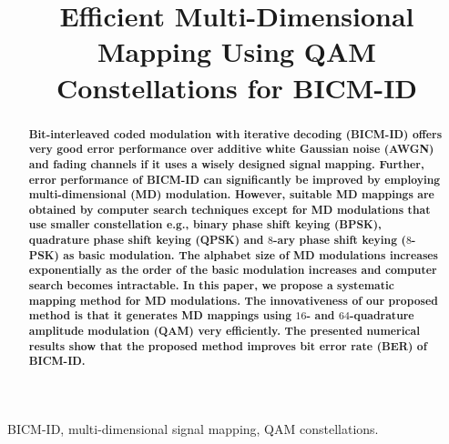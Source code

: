 \documentclass[12pt, draftclsnofoot, onecolumn]{IEEEtran}
\begin{document}
\sloppy
\title{Efficient Multi-Dimensional Mapping Using QAM Constellations for BICM-ID}

\author{
}
\maketitle
\begin{abstract}
\textbf{Bit-interleaved coded modulation with iterative decoding (BICM-ID)  offers  very good error performance over   additive white Gaussian noise (AWGN) and fading channels if it uses a wisely designed signal mapping. Further,  error performance of BICM-ID can  significantly be improved by employing multi-dimensional (MD) modulation. However,  suitable  MD mappings   are obtained by computer search techniques   except for  MD modulations that use smaller constellation   e.g.,  binary phase shift keying (BPSK), quadrature phase shift keying (QPSK) and $8$-ary phase shift keying ($8$-PSK) as basic modulation. The alphabet size of MD modulations  increases exponentially as the order of the basic modulation increases and computer search  becomes intractable. %
In this paper, we propose a systematic  mapping method for MD modulations. The innovativeness of our proposed method is that  it    generates  MD mappings  using $16$- and $64$-quadrature amplitude modulation (QAM)  very efficiently. The presented numerical results show that the proposed method  improves  bit error rate (BER) of BICM-ID.}
\end{abstract}

\begin{IEEEkeywords}
BICM-ID, multi-dimensional signal mapping, QAM constellations.
\end{IEEEkeywords}
\end{document}
